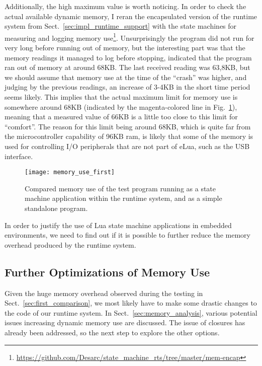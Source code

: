Additionally, the high maximum value is worth noticing. In order to check the actual available dynamic memory, I reran the encapsulated version of the runtime system from Sect.~\ref{sec:impl_runtime_support} with the state machines for measuring and logging memory use\footnote{\url{https://github.com/Desarc/state_machine_rts/tree/master/mem-encap}}. Unsurprisingly the program did not run for very long before running out of memory, but the interesting part was that the memory readings it managed to log before stopping, indicated that the program ran out of memory at around 68KB. The last received reading was 63,8KB, but we should assume that memory use at the time of the ``crash'' was higher, and judging by the previous readings, an increase of 3-4KB in the short time period seems likely. This implies that the actual maximum limit for memory use is somewhere around 68KB (indicated by the magenta-colored line in Fig.~\ref{fig:memory_use_first}), meaning that a measured value of 66KB is a little too close to this limit for ``comfort''. The reason for this limit being around 68KB, which is quite far from the microcontroller capability of 96KB \gls{ram}, is likely that some of the memory is used for controlling I/O peripherals that are not part of eLua, such as the USB interface.

\begin{figure}[htp]
	\centering
	\texttt{[image: memory\_use\_first]}
	\caption[Results of first memory overhead test]{Compared memory use of the test program running as a state machine application within the runtime system, and as a simple standalone program.}
	\label{fig:memory_use_first}
\end{figure}

In order to justify the use of Lua state machine applications in embedded environments, we need to find out if it is possible to further reduce the memory overhead produced by the runtime system.

\subsection{Further Optimizations of Memory Use}
\label{sec:more_optimization}
Given the huge memory overhead observed during the testing in Sect.~\ref{sec:first_comparison}, we most likely have to make some drastic changes to the code of our runtime system. In Sect.~\ref{sec:memory_analysis}, various potential issues increasing dynamic memory use are discussed. The issue of closures has already been addressed, so the next step to explore the other options.


